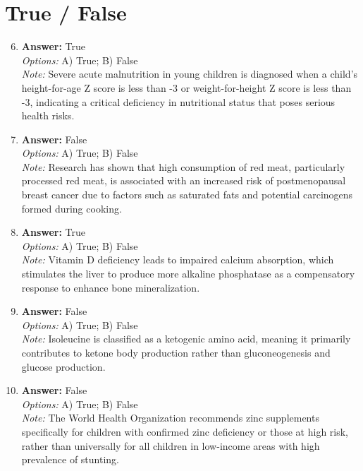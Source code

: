 \documentclass[12pt]{article}
\begin{document}
\section*{True / False}
\begin{enumerate}[label=\arabic*.]
\setcounter{enumi}{5}
\item \textbf{Answer:} True
\\ \textit{Options:} A) True; B) False
\\ \textit{Note:} Severe acute malnutrition in young children is diagnosed when a child's height-for-age Z score is less than -3 or weight-for-height Z score is less than -3, indicating a critical deficiency in nutritional status that poses serious health risks.
\item \textbf{Answer:} False
\\ \textit{Options:} A) True; B) False
\\ \textit{Note:} Research has shown that high consumption of red meat, particularly processed red meat, is associated with an increased risk of postmenopausal breast cancer due to factors such as saturated fats and potential carcinogens formed during cooking.
\item \textbf{Answer:} True
\\ \textit{Options:} A) True; B) False
\\ \textit{Note:} Vitamin D deficiency leads to impaired calcium absorption, which stimulates the liver to produce more alkaline phosphatase as a compensatory response to enhance bone mineralization.
\item \textbf{Answer:} False
\\ \textit{Options:} A) True; B) False
\\ \textit{Note:} Isoleucine is classified as a ketogenic amino acid, meaning it primarily contributes to ketone body production rather than gluconeogenesis and glucose production.
\item \textbf{Answer:} False
\\ \textit{Options:} A) True; B) False
\\ \textit{Note:} The World Health Organization recommends zinc supplements specifically for children with confirmed zinc deficiency or those at high risk, rather than universally for all children in low-income areas with high prevalence of stunting.
\end{enumerate}
\end{document}
